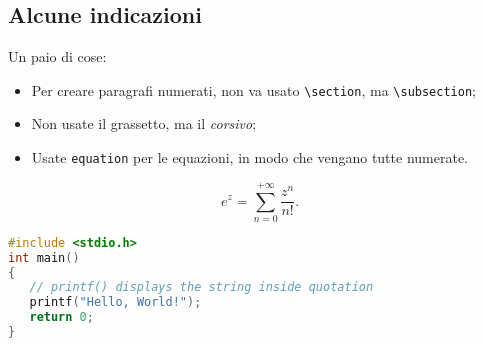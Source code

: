

\subsection{Alcune indicazioni}

Un paio di cose:
\begin{itemize}
\item Per creare paragrafi numerati, non va usato \lstinline|\section|, ma \lstinline|\subsection|;
\item Non usate il grassetto, ma il \emph{corsivo};
\item Usate \texttt{equation}  per le equazioni, in modo che vengano tutte numerate.
\end{itemize}
\begin{equation}
e^{z}=\sum_{n=0}^{+\infty} \frac{z^n}{n!}.
\end{equation}

\lipsum[3]

\begin{lstlisting}[language=C]
#include <stdio.h>
int main()
{
   // printf() displays the string inside quotation
   printf("Hello, World!");
   return 0;
}
\end{lstlisting}